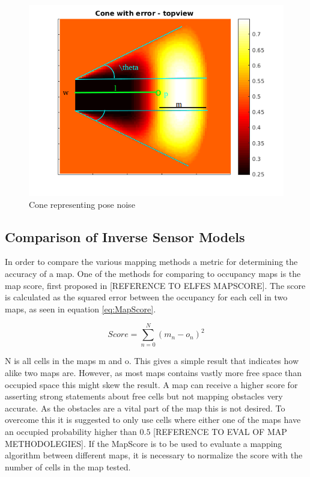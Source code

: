 \begin{figure}
	\centering
	\includegraphics[width=\textwidth]{figures/static_mapping/cone_noise_top}
	\caption{Cone representing pose noise}
	\label{fig:cone_with_noise_top}
\end{figure}

\subsection{Comparison of Inverse Sensor Models}
In order to compare the various mapping methods a metric for determining the accuracy of a map. One of the methods for comparing to occupancy maps is the map score, first proposed in [REFERENCE TO ELFES MAPSCORE]. The score is calculated as the squared error between the occupancy for each cell in two maps, as seen in equation \ref{eq:MapScore}.

\begin{equation}
\label{eq:MapScore}
Score = \sum_{n=0}^{N} (m_{n} - o_{n})^2
\end{equation}

N is all cells in the maps m and o. This gives a simple result that indicates how alike two maps are. However, as most maps contains vastly more free space than occupied space this might skew the result. A map can receive a higher score for asserting strong statements about free cells but not mapping obstacles very accurate. As the obstacles are a vital part of the map this is not desired. To overcome this it is suggested to only use cells where either one of the maps have an occupied probability higher than \(0.5\) [REFERENCE TO EVAL OF MAP METHODOLEGIES]. If the MapScore is to be used to evaluate a mapping algorithm between different maps, it is necessary to normalize the score with the number of cells in the map tested. 

